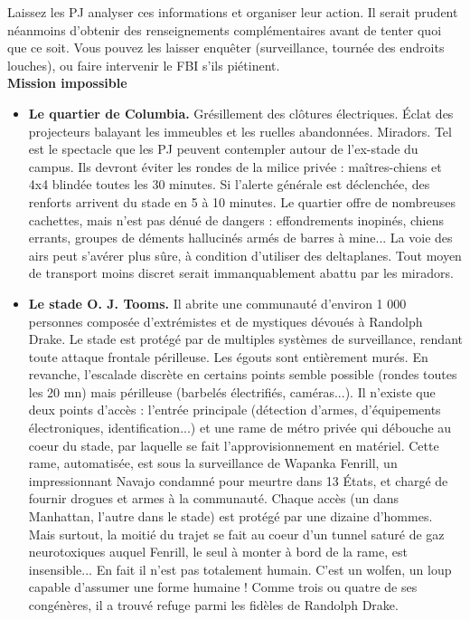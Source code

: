 \documentclass[11pt,twoside,a4paper]{book}
\begin{document}
Laissez les PJ analyser ces informations et organiser leur action. Il serait prudent n{\'e}anmoins d'obtenir des renseignements compl{\'e}mentaires avant de tenter quoi que ce soit. Vous pouvez les laisser enqu{\^e}ter (surveillance, tourn{\'e}e des endroits louches), ou faire intervenir le FBI s'ils pi{\'e}tinent.~\\

\textbf{Mission impossible}~\\

\setlength\parindent{20pt}
\begin{itemize}
	\item \textbf{Le quartier de Columbia. }Gr{\'e}sillement des cl{\^o}tures {\'e}lectriques. {\'E}clat des projecteurs balayant les immeubles et les ruelles abandonn{\'e}es. Miradors. Tel est le spectacle que les PJ peuvent contempler autour de l'ex-stade du campus. Ils devront {\'e}viter les rondes de la milice priv{\'e}e : ma{\^i}tres-chiens et 4x4 blind{\'e}e toutes les 30 minutes. Si l'alerte g{\'e}n{\'e}rale est d{\'e}clench{\'e}e, des renforts arrivent du stade en 5 {\`a} 10 minutes. Le quartier offre de nombreuses cachettes, mais n'est pas d{\'e}nu{\'e} de dangers : effondrements inopin{\'e}s, chiens errants, groupes de d{\'e}ments hallucin{\'e}s arm{\'e}s de barres {\`a} mine... La voie des airs peut s'av{\'e}rer plus s{\^u}re, {\`a} condition d'utiliser des deltaplanes. Tout moyen de transport moins discret serait immanquablement abattu par les miradors.
	\item \textbf{Le stade O. J. Tooms. }Il abrite une communaut{\'e} d'environ 1 000 personnes compos{\'e}e d'extr{\'e}mistes et de mystiques d{\'e}vou{\'e}s {\`a} Randolph Drake. Le stade est prot{\'e}g{\'e} par de multiples syst{\`e}mes de surveillance, rendant toute attaque frontale p{\'e}rilleuse. Les {\'e}gouts sont enti{\`e}rement mur{\'e}s. En revanche, l'escalade discr{\`e}te en certains points semble possible (rondes toutes les 20 mn) mais p{\'e}rilleuse (barbel{\'e}s {\'e}lectrifi{\'e}s, cam{\'e}ras...). Il n'existe que deux points d'acc{\`e}s : l'entr{\'e}e principale (d{\'e}tection d'armes, d'{\'e}quipements {\'e}lectroniques, identification...) et une rame de m{\'e}tro priv{\'e}e qui d{\'e}bouche au coeur du stade, par laquelle se fait l'approvisionnement en mat{\'e}riel. Cette rame, automatis{\'e}e, est sous la surveillance de Wapanka Fenrill, un impressionnant Navajo condamn{\'e} pour meurtre dans 13 {\'E}tats, et charg{\'e} de fournir drogues et armes {\`a} la communaut{\'e}. Chaque acc{\`e}s (un dans Manhattan, l'autre dans le stade) est prot{\'e}g{\'e} par une dizaine d'hommes. Mais surtout, la moiti{\'e} du trajet se fait au coeur d'un tunnel satur{\'e} de gaz neurotoxiques auquel Fenrill, le seul {\`a} monter {\`a} bord de la rame, est insensible... En fait il n'est pas totalement humain. C'est un wolfen, un loup capable d'assumer une forme humaine ! Comme trois ou quatre de ses cong{\'e}n{\`e}res, il a trouv{\'e} refuge parmi les fid{\`e}les de Randolph Drake.
\end{itemize}~\\
\setlength\parindent{0pt}
\end{document}
